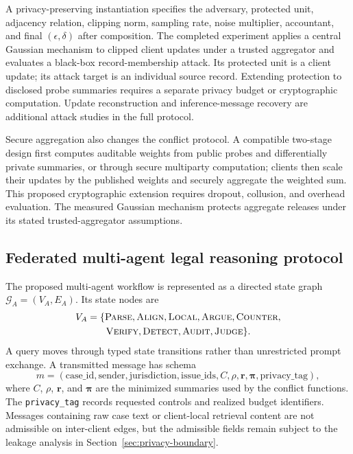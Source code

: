 \documentclass[a4paper,fleqn]{cas-sc}
\newcommand{\graph}{\mathcal{G}}
\begin{document}
A privacy-preserving instantiation specifies the adversary, protected unit, adjacency relation, clipping norm, sampling rate, noise multiplier, accountant, and final $(\epsilon,\delta)$ after composition. The completed experiment applies a central Gaussian mechanism to clipped client updates under a trusted aggregator and evaluates a black-box record-membership attack. Its protected unit is a client update; its attack target is an individual source record. Extending protection to disclosed probe summaries requires a separate privacy budget or cryptographic computation. Update reconstruction and inference-message recovery are additional attack studies in the full protocol.

Secure aggregation also changes the conflict protocol. A compatible two-stage design first computes auditable weights from public probes and differentially private summaries, or through secure multiparty computation; clients then scale their updates by the published weights and securely aggregate the weighted sum. This proposed cryptographic extension requires dropout, collusion, and overhead evaluation. The measured Gaussian mechanism protects aggregate releases under its stated trusted-aggregator assumptions.

\subsection{Federated multi-agent legal reasoning protocol}

The proposed multi-agent workflow is represented as a directed state graph $\graph_A=(V_A,E_A)$. Its state nodes are
\begin{multline*}
V_A = \{\textsc{Parse},\textsc{Align},\textsc{Local},\textsc{Argue},\textsc{Counter},\\
\textsc{Verify},\textsc{Detect},\textsc{Audit},\textsc{Judge}\}.
\end{multline*}
A query moves through typed state transitions rather than unrestricted prompt exchange. A transmitted message has schema
\begin{equation}
    m = (\mathrm{case\_id}, \mathrm{sender}, \mathrm{jurisdiction},
    \mathrm{issue\_ids}, C, \rho, \bm{r}, \bm{\pi}, \mathrm{privacy\_tag}),
\end{equation}
where $C$, $\rho$, $\bm{r}$, and $\bm{\pi}$ are the minimized summaries used by the conflict functions. The \texttt{privacy\_tag} records requested controls and realized budget identifiers. Messages containing raw case text or client-local retrieval content are not admissible on inter-client edges, but the admissible fields remain subject to the leakage analysis in Section~\ref{sec:privacy-boundary}.
\end{document}

